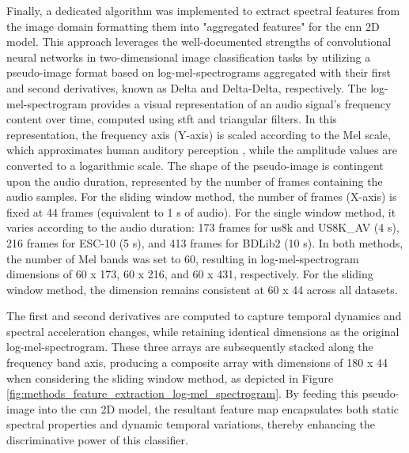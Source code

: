 Finally, a dedicated algorithm was implemented to extract spectral features from the image domain formatting them into "aggregated features" for the \gls{cnn} 2D model. This approach leverages the well-documented strengths of convolutional neural networks in two-dimensional image classification tasks by utilizing a pseudo-image format based on log-mel-spectrograms aggregated with their first and second derivatives, known as Delta and Delta-Delta, respectively. The log-mel-spectrogram provides a visual representation of an audio signal's frequency content over time, computed using \gls{stft} and triangular filters. In this representation, the frequency axis (Y-axis) is scaled according to the Mel scale, which approximates human auditory perception \cite{Moore2013}, while the amplitude values are converted to a logarithmic scale. The shape of the pseudo-image is contingent upon the audio duration, represented by the number of frames containing the audio samples. For the sliding window method, the number of frames (X-axis) is fixed at 44 frames (equivalent to 1 \gls{s} of audio). For the single window method, it varies according to the audio duration: 173 frames for \gls{us8k} and US8K\_AV (4 \gls{s}), 216 frames for ESC-10 (5 \gls{s}), and 413 frames for BDLib2 (10 \gls{s}). In both methods, the number of Mel bands was set to 60, resulting in log-mel-spectrogram dimensions of 60 x 173, 60 x 216, and 60 x 431, respectively. For the sliding window method, the dimension remains consistent at 60 x 44 across all datasets.

The first and second derivatives are computed to capture temporal dynamics and spectral acceleration changes, while retaining identical dimensions as the original log-mel-spectrogram. These three arrays are subsequently stacked along the frequency band axis, producing a composite array with dimensions of 180 x 44 when considering the sliding window method, as depicted in Figure \ref{fig:methods_feature_extraction_log-mel_spectrogram}. By feeding this pseudo-image into the \gls{cnn} 2D model, the resultant feature map encapsulates both static spectral properties and dynamic temporal variations, thereby enhancing the discriminative power of this classifier.

